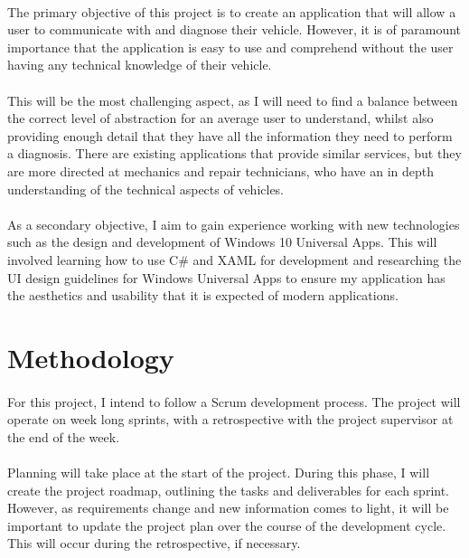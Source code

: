 \documentclass[12pt]{report}
\begin{document}
			\paragraph{}{
			The primary objective of this project is to create an application that will allow a user to communicate with and diagnose their vehicle. However, it is of paramount importance that the application is easy to use and comprehend without the user having any technical knowledge of their vehicle.  
			}
			\paragraph{}
			{
			This will be the most challenging aspect, as I will need to find a balance between the correct level of abstraction for an average user to understand, whilst also providing enough detail that they have all the information they need to perform a diagnosis. There are existing applications that provide similar services, but they are more directed at mechanics and repair technicians, who have an in depth understanding of the technical aspects of vehicles.
			}
			\paragraph{}{
			As a secondary objective, I aim to gain experience working with new technologies such as the design and development of Windows 10 Universal Apps. This will involved learning how to use C{\#} and XAML for development and researching the UI design guidelines for Windows Universal Apps to ensure my application has the aesthetics and usability that it is expected of modern applications.
			}
		\section{Methodology}
			\paragraph{}{
			For this project, I intend to follow a Scrum development process. The project will operate on week long sprints, with a retrospective with the project supervisor at the end of the week.
			}
			\paragraph{}{
			Planning will take place at the start of the project. During this phase, I will create the project roadmap, outlining the tasks and deliverables for each sprint. However, as requirements change and new information comes to light, it will be important to update the project plan over the course of the development cycle. This will occur during the retrospective, if necessary.
			}
\end{document}
